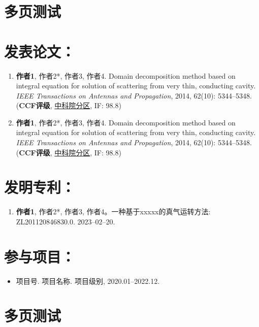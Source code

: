 \documentclass[print, doctor, vlined]{DissertUESTC}
\begin{document}
	\section{多页测试}
	
	\achievement %
	
	\section*{发表论文：}
	
	\begin{enumerate}
	    \item \textbf{作者1}, 作者2*, 作者3, 作者4. Domain decomposition method based on integral equation for solution of scattering from very thin, conducting cavity. \emph{IEEE Transactions on Antennas and Propagation}, 2014, 62(10): 5344--5348. (\textbf{CCF评级}, \underline{中科院分区}, IF: 98.8)
	    
		\setcounter{enumi}{98}
	    
		\item \textbf{作者1}, 作者2*, 作者3, 作者4. Domain decomposition method based on integral equation for solution of scattering from very thin, conducting cavity. \emph{IEEE Transactions on Antennas and Propagation}, 2014, 62(10): 5344--5348. (\textbf{CCF评级}, \underline{中科院分区}, IF: 98.8)
	\end{enumerate}
	
	\section*{发明专利：}
	

	\begin{enumerate}
		
		\item \textbf{作者1}, 作者2*, 作者3, 作者4。一种基于xxxxx的真气运转方法: ZL201120846830.0. 2023--02--20.
		
	\end{enumerate}
	
	\section*{参与项目：}
	
	\begin{itemize}
		\item 项目号. 项目名称. 项目级别, 2020.01--2022.12.
	\end{itemize}

	\newpage
	\section*{多页测试}
\end{document}
